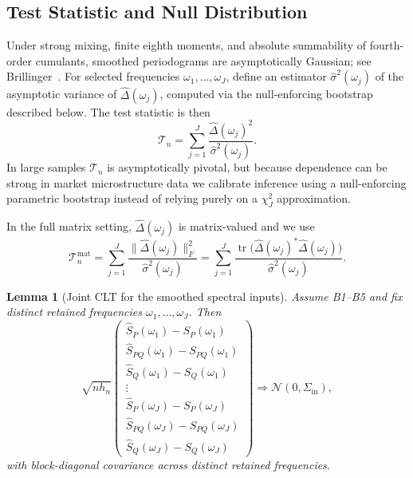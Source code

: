 \documentclass[11pt]{article}
\newtheorem{lemma}[theorem]{Lemma}
\newcommand{\cT}{\mathcal{T}}
\newcommand{\tr}{\operatorname{tr}}
\newcommand{\REV}{}
\begin{document}
\subsection{Test Statistic and Null Distribution}
Under strong mixing, finite eighth moments, and absolute summability of fourth-order cumulants, smoothed periodograms are asymptotically Gaussian; see Brillinger~\cite{Brillinger2001}. For selected frequencies $\omega_1,\dots,\omega_J$, define
an estimator $\widehat{\sigma}^2(\omega_j)$ of the asymptotic variance of $\widehat{\Delta}(\omega_j)$, computed via the null-enforcing bootstrap described below. The test statistic is then
\begin{equation}\label{eq:test-stat}
  \cT_n=\sum_{j=1}^J \frac{\widehat{\Delta}(\omega_j)^2}{\widehat{\sigma}^2(\omega_j)}.
\end{equation}
In large samples $\cT_n$ is asymptotically pivotal, but because dependence can be strong in market microstructure data we calibrate inference using a null-enforcing parametric bootstrap instead of relying purely on a $\chi_J^2$ approximation.

In the full matrix setting, $\widehat{\Delta}(\omega_j)$ is matrix-valued and we use
\[
  \cT_n^{\mathrm{mat}}=\sum_{j=1}^J \frac{\|\widehat{\Delta}(\omega_j)\|_F^2}{\widehat{\sigma}^2(\omega_j)}
  =
  \sum_{j=1}^J \frac{\tr\!\big(\widehat{\Delta}(\omega_j)^\ast \widehat{\Delta}(\omega_j)\big)}{\widehat{\sigma}^2(\omega_j)}.
\]

\begin{lemma}[Joint CLT for the smoothed spectral inputs]\label{lem:spectral-input-clt}\REV
Assume B1--B5 and fix distinct retained frequencies $\omega_1,\dots,\omega_J$. Then
\[
  \sqrt{n h_n}
  \left(
    \begin{array}{c}
      \widehat{S}_P(\omega_1)-S_P(\omega_1) \\
      \widehat{S}_{PQ}(\omega_1)-S_{PQ}(\omega_1) \\
      \widehat{S}_Q(\omega_1)-S_Q(\omega_1) \\
      \vdots \\
      \widehat{S}_P(\omega_J)-S_P(\omega_J) \\
      \widehat{S}_{PQ}(\omega_J)-S_{PQ}(\omega_J) \\
      \widehat{S}_Q(\omega_J)-S_Q(\omega_J)
    \end{array}
  \right)
  \Rightarrow \mathcal N(0,\Sigma_{\mathrm{in}}),
\]
with block-diagonal covariance across distinct retained frequencies.
\end{lemma}
\end{document}
